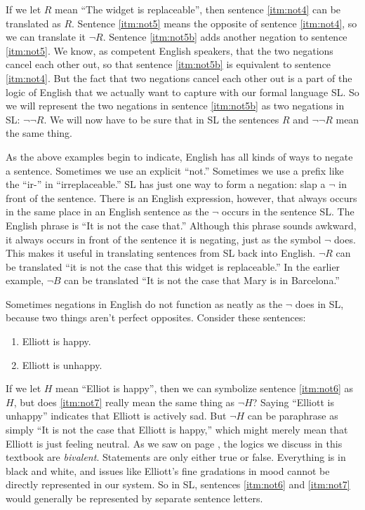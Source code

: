 If we let $R$ mean ``The widget is replaceable'', then sentence \ref{itm:not4} can be translated as $R$. Sentence \ref{itm:not5} means the opposite of sentence \ref{itm:not4}, so we can translate it $\lnot R$. Sentence \ref{itm:not5b} adds another negation to sentence \ref{itm:not5}. We know, as competent English speakers, that the two negations cancel each other out, so that sentence \ref{itm:not5b} is equivalent to sentence \ref{itm:not4}. But the fact that two negations cancel each other out is a part of the logic of English that we actually want to capture with our formal language SL.
So we will represent the two negations in sentence \ref{itm:not5b} as two negations in SL: $\lnot\lnot R$. We will now have to be sure that in SL the sentences $R$ and $\lnot \lnot R$ mean the same thing.

As the above examples begin to indicate, English has all kinds of ways to negate a sentence.  Sometimes we use an explicit ``not.'' Sometimes we use a prefix like the ``ir-'' in ``irreplaceable.'' SL has just one way to form a negation: slap a $\lnot$ in front of the sentence. There is an English expression, however, that always occurs in the same place in an English sentence as the $\lnot$ occurs in the sentence SL. The English phrase is ``It is not the case that.'' Although this phrase sounds awkward, it always occurs in front of the sentence it is negating, just as the symbol $\lnot$ does. This makes it useful in translating sentences from SL back into English. $\lnot R$ can be translated ``it is not the case that this widget is replaceable.'' In the earlier example, $\lnot B$ can be translated ``It is not the case that Mary is in Barcelona.''


Sometimes negations in English do not function as neatly as the $\lnot$ does in SL, because two things aren't perfect opposites. Consider these sentences:

\begin{enumerate}
\item Elliott is happy. \label{itm:not6}
\item Elliott is unhappy. \label{itm:not7}
\end{enumerate}


If we let $H$ mean ``Elliot is happy'', then we can symbolize sentence \ref{itm:not6} as $H$, but does \ref{itm:not7} really mean the same thing as $\lnot H$? Saying ``Elliott is unhappy'' indicates that Elliott is actively sad. But $\lnot H$ can be paraphrase as simply ``It is not the case that Elliott is happy,'' which might merely mean that Elliott is just feeling neutral. As we saw on page \pageref{def:bivalent}, the logics we discuss in this textbook are \emph{bivalent}. Statements are only either true or false. Everything is in black and white, and issues like Elliott's fine gradations in mood cannot be directly represented in our system. So in SL, sentences \ref{itm:not6} and  \ref{itm:not7} would generally be represented by separate sentence letters.

